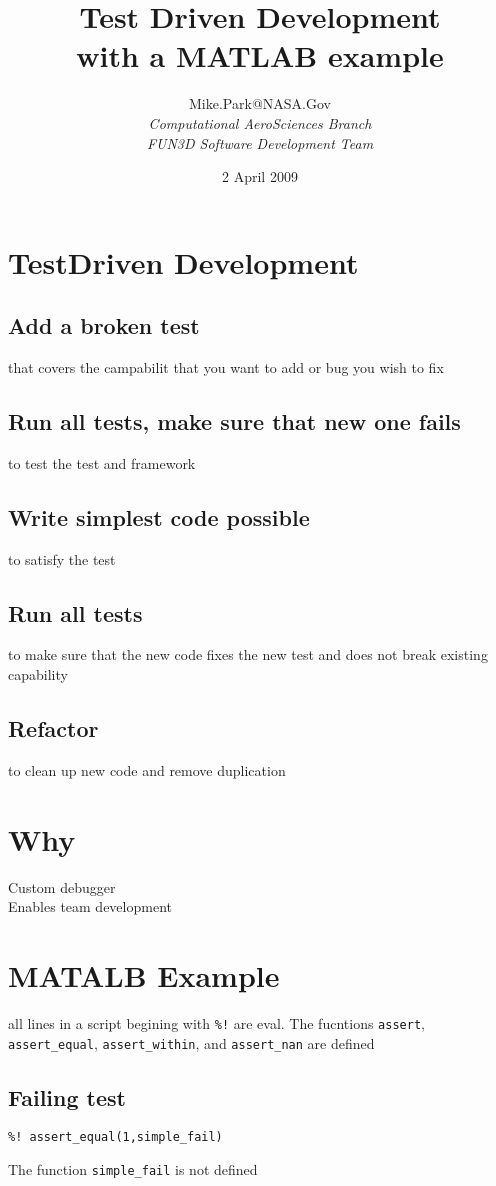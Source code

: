 \documentclass[twocolumn]{article}
\title{{\bfseries\Large Test Driven Development}\\ with a MATLAB example}
\author{
Mike.Park@NASA.Gov\\
	 {\itshape Computational AeroSciences Branch} \\
	 {\itshape FUN3D Software Development Team}
}
\date{2 April 2009}
\begin{document}
  
  \maketitle

  \section{TestDriven Development}
  \subsection{Add a broken test}
  that covers the campabilit that you want to add or bug you wish to fix
  \subsection{Run all tests, make sure that new one fails}
  to test the test and framework
  \subsection{Write simplest code possible}
  to satisfy the test
  \subsection{Run all tests}
  to make sure that the new code fixes the new test and does not break
  existing capability
  \subsection{Refactor}
  to clean up new code and remove duplication

  \section{Why}

  Custom debugger\\
  Enables team development

  \section{MATALB Example}
  all lines in a script begining with \texttt{\%!} are eval. 
  The fucntions \texttt{assert}, \texttt{assert\_equal}, 
  \texttt{assert\_within}, and \texttt{assert\_nan} are defined
  \subsection{Failing test}
  \begin{verbatim}
%! assert_equal(1,simple_fail)
  \end{verbatim}
  The function \texttt{simple\_fail} is not defined 
\end{document}
